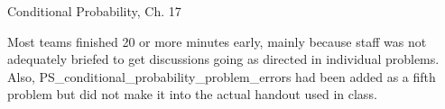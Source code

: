 \documentclass[handout]{mcs}
\begin{document}

\begin{staffnotes}
Conditional Probability, Ch. 17

Most teams finished 20 or more minutes early, mainly because staff was
not adequately briefed to get discussions going as directed in
individual problems.  Also,
PS\_conditional\_probability\_problem\_errors had been added as a
fifth problem but did not make it into the actual handout used in
class.
\end{staffnotes}











\end{document}
